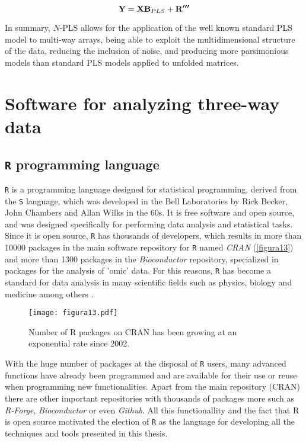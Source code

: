 \begin{equation}
\textbf{\text{Y}}=\textbf{\text{X}}\textbf{\text{B}}_{PLS}+\textbf{\text{R}}^{\boldsymbol{\prime{}\prime{}\prime{}}}
\label{equation04}
\end{equation}

In summary, $N$-PLS allows for the application of the well known standard PLS model to multi-way arrays, being able to exploit the multidimensional structure of the data, reducing the inclusion of noise, and producing more parsimonious models than standard PLS models applied to unfolded matrices. 


\section{Software for analyzing three-way data}
\subsection{\texttt{R} programming language}
\texttt{R} \parencite{ihaka1996r, rsoftware} is a programming language designed for statistical programming, derived from the \texttt{S} language, which was developed in the Bell Laboratories by Rick Becker, John Chambers and Allan Wilks in the 60s. It is free software and open source, and was designed specifically for performing data analysis and statistical tasks. Since it is open source, \texttt{R} has thousands of developers, which results in more than 10000 packages in the main software repository for \texttt{R} named \textit{CRAN} (\autoref{figura13}) and more than 1300 packages in the \textit{Bioconductor} repository, specialized in packages for the analysis of 'omic' data. For this reasons, \texttt{R} has become a standard for data analysis in many scientific fields such as physics, biology and medicine among others \parencite{goztepe4facto}. 

\begin{figure}[hbtp]
	\centering
\texttt{[image: figura13.pdf]}
\caption[Number of R packages on CRAN since 2002]{Number of R packages on CRAN has been growing at an exponential rate since 2002.}
\label{figura13}
\end{figure}

With the huge number of packages at the disposal of \texttt{R} users, many advanced functions have already been programmed and are available for their use or reuse when programming new functionalities. Apart from the main repository (CRAN) there are other important repositories with thousands of packages more such as \textit{R-Forge}, \textit{Bioconductor} or even \textit{Github}. All this functionallity and the fact that R is open source motivated the election of \texttt{R} as the language for developing all the techniques and tools presented in this thesis.

